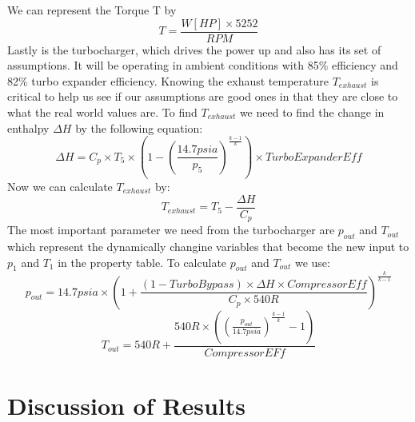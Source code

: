 \documentclass{article}
\begin{document}
\noindent We can represent the Torque T by 
\begin{equation}
    T = \frac{W[HP]\times 5252}{RPM}
\end{equation}
\noindent Lastly is the turbocharger, which drives the power up and also has its set of assumptions. It will be operating in ambient conditions with 85\% efficiency and 82\% turbo expander efficiency. Knowing the exhaust temperature $T_{exhaust}$ is critical to help us see if our assumptions are good ones in that they are close to what the real world values are. To find $T_{exhaust}$ we need to find the change in enthalpy $\Delta H$ by the following equation:
\begin{equation}
    \Delta H = C_p\times T_5\times (1-(\frac{14.7psia}{p_5})^{\frac{k-1}{k}})\times TurboExpanderEff
\end{equation}
\noindent Now we can calculate $T_{exhaust}$ by:
\begin{equation}
    T_{exhaust} = T_5 - \frac{\Delta H}{C_p}
\end{equation}
\noindent The most important parameter we need from the turbocharger are $p_{out}$ and $T_{out}$ which represent the dynamically changine variables that become the new input to $p_1$ and $T_1$ in the property table. To calculate $p_{out}$ and $T_{out}$ we use:
\begin{equation}
    p_{out} = 14.7psia\times (1+\frac{(1-TurboBypass)\times \Delta H\times CompressorEff}{C_p\times 540 R})^{\frac{k}{k-1}}
\end{equation}
\begin{equation}
    T_{out} = 540R+\frac{540R\times((\frac{p_{out}}{14.7psia})^{\frac{k-1}{k}}-1)}{CompressorEFf}
\end{equation}

\section{Discussion of Results}
\end{document}
